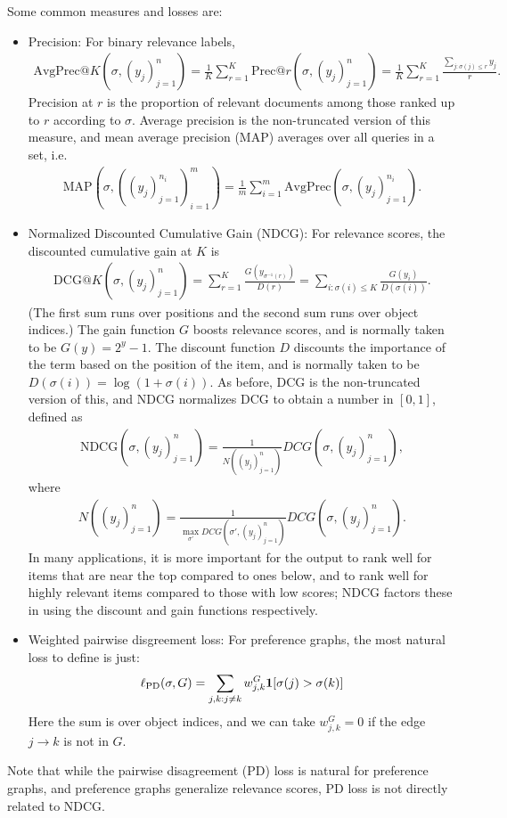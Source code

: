 Some common measures and losses are:
\begin{itemize}
\item Precision: For binary relevance labels, 
  \begin{align*}
    \text{AvgPrec}@K(\sigma, (y_j)_{j=1}^n)
    = \frac{1}{K} \sum_{r=1}^K \text{Prec}@r(\sigma, (y_j)_{j=1}^n)
    = \frac{1}{K} \sum_{r=1}^K \frac{\sum_{j : \sigma(j) \leq r} y_j}{r}.
  \end{align*}
  Precision at $r$ is the proportion of relevant documents among those 
  ranked up to $r$ according to $\sigma$. Average precision is the
  non-truncated version of this measure, and mean average precision (MAP)
  averages  over all queries in a set, i.e.
  \begin{align*}
    \text{MAP}(\sigma, ((y_j)_{j=1}^{n_i})_{i=1}^m) =
    \frac{1}{m} \sum_{i=1}^m \text{AvgPrec}(\sigma, (y_j)_{j=1}^{n_i}).
  \end{align*}
\item Normalized Discounted Cumulative Gain (NDCG): For relevance scores,
  the discounted cumulative gain at $K$ is 
  \begin{align*}
    \text{DCG}@K(\sigma, (y_j)_{j=1}^n)
    = \sum_{r=1}^K \frac{G(y_{\sigma^{-1}(r)})}{D(r)}
    = \sum_{i: \sigma(i) \leq K} \frac{G(y_i)}{D(\sigma(i))}.
  \end{align*}
  (The first sum runs over positions and the second sum runs over
  object indices.) The gain function $G$ boosts relevance scores, and is
  normally taken to be $G(y) = 2^y - 1$. The discount function $D$ discounts
  the importance of the term based on the position of the item, and is
  normally taken to be $D(\sigma(i)) = \log(1 + \sigma(i))$. As before, DCG
  is the non-truncated version of this, and NDCG normalizes DCG to obtain
  a number in $[0,1]$, defined as
  \begin{align*}
    \text{NDCG}(\sigma, (y_j)_{j=1}^n)
    = \frac{1}{N((y_j)_{j=1}^n)} DCG(\sigma, (y_j)_{j=1}^n),
  \end{align*}
  where
  \begin{align*}
    N((y_j)_{j=1}^n)
    = \frac{1}{\max_{\sigma'} DCG(\sigma', (y_j)_{j=1}^n)} DCG(\sigma, (y_j)_{j=1}^n).
  \end{align*}
  In many applications, it is more important for the output to rank well for
  items that are near the top compared to ones below, and to rank well for
  highly relevant items compared to those with low scores; NDCG factors
  these in using the discount and gain functions respectively.

\item Weighted pairwise disgreement loss: For preference graphs, the most
  natural loss to define is just:
  \begin{align*}
    \ell_{\text{PD}}(\sigma, G)
    = \sum_{j,k: j \neq k} w_{j,k}^G {\mathbf 1}[\sigma(j) > \sigma(k)]
  \end{align*}
  Here the sum is over object indices, and we can take $w_{j,k}^G = 0$ if
  the edge $j \to k$ is not in $G$. 
\end{itemize}
Note that while the pairwise disagreement (PD) loss is natural for preference
graphs, and preference graphs generalize relevance scores, PD loss is not
directly related to NDCG.

